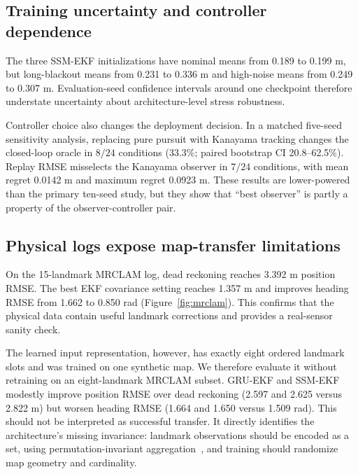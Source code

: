 \documentclass{article}
\begin{document}
\subsection{Training uncertainty and controller dependence}
The three SSM-EKF initializations have nominal means from 0.189 to 0.199 m, but long-blackout means from 0.231 to 0.336 m and high-noise means from 0.249 to 0.307 m. Evaluation-seed confidence intervals around one checkpoint therefore understate uncertainty about architecture-level stress robustness.

Controller choice also changes the deployment decision. In a matched five-seed sensitivity analysis, replacing pure pursuit with Kanayama tracking changes the closed-loop oracle in $8/24$ conditions (33.3\%; paired bootstrap CI 20.8--62.5\%). Replay RMSE misselects the Kanayama observer in $7/24$ conditions, with mean regret 0.0142 m and maximum regret 0.0923 m. These results are lower-powered than the primary ten-seed study, but they show that ``best observer'' is partly a property of the observer-controller pair.



\subsection{Physical logs expose map-transfer limitations}
On the 15-landmark MRCLAM log, dead reckoning reaches 3.392 m position RMSE. The best EKF covariance setting reaches 1.357 m and improves heading RMSE from 1.662 to 0.850 rad (Figure~\ref{fig:mrclam}). This confirms that the physical data contain useful landmark corrections and provides a real-sensor sanity check.

The learned input representation, however, has exactly eight ordered landmark slots and was trained on one synthetic map. We therefore evaluate it without retraining on an eight-landmark MRCLAM subset. GRU-EKF and SSM-EKF modestly improve position RMSE over dead reckoning (2.597 and 2.625 versus 2.822 m) but worsen heading RMSE (1.664 and 1.650 versus 1.509 rad). This should not be interpreted as successful transfer. It directly identifies the architecture's missing invariance: landmark observations should be encoded as a set, using permutation-invariant aggregation~\citep{zaheer2017deepsets,lee2019settransformer}, and training should randomize map geometry and cardinality.
\end{document}

